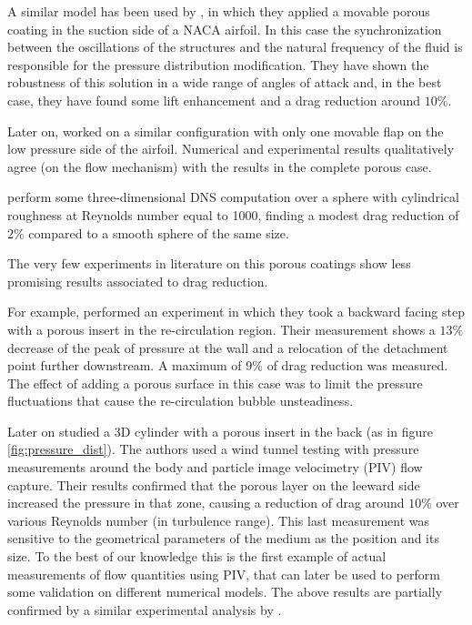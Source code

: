 A similar model has been used by \citet{venkataraman2012numerical}, in which they applied a movable porous coating in the suction side of a NACA airfoil.
In this case the synchronization between the oscillations of the structures and the natural frequency of the fluid is responsible for the pressure distribution modification.
They have shown the robustness of this solution in a wide range of angles of attack and, in the best case, they have found some lift enhancement and a drag reduction around $10\%$.

Later on, \citet{rosti2017pelskin} worked on a similar configuration with only one movable flap on the low pressure side of the airfoil. Numerical and experimental results qualitatively agree (on the flow mechanism) with the results in the complete porous case.

\citet{zampogna2017new} perform some three-dimensional DNS computation over a sphere with cylindrical roughness at Reynolds number equal to 1000, finding a modest drag reduction of $2\%$ compared to a smooth sphere of the same size.

The very few experiments in literature on this porous coatings show less promising results associated to drag reduction.

For example, \citet{heenan1998passive} performed an experiment in which they took a backward facing step with a porous insert in the re-circulation region.
Their measurement shows a $13\%$ decrease of the peak of pressure at the wall and a relocation of the detachment point further downstream.
A maximum of $9\%$ of drag reduction was measured.
The effect of adding a porous surface in this case was to limit the pressure fluctuations that cause the re-circulation bubble unsteadiness.

Later on \citet{klausmann2017drag} studied a 3D cylinder with a porous insert in the back (as in figure \ref{fig:pressure_dist}). The authors used a wind tunnel testing with pressure measurements around the body and particle image velocimetry (PIV) flow capture.
Their results confirmed that the porous layer on the leeward side increased the pressure in that zone, causing a reduction of drag around $10\%$ over various Reynolds number (in turbulence range). This last measurement was sensitive to the geometrical parameters of the medium as the position and its size.
To the best of our knowledge this is the first example of actual measurements of flow quantities using PIV, that can later be used to perform some validation on different numerical models.
The above results are partially confirmed by a similar experimental analysis by \citet{grizzetti2015esperimenti}.

